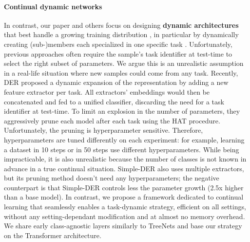 \paragraph{Continual dynamic networks} In contrast, our paper and others focus on designing
\textbf{dynamic architectures} that best handle a growing training distribution
\citep{yoon2018dynamically_expandable_networks,li2019learning_to_grow}, in particular by dynamically
creating (sub-)members each specialized in one specific task
\citep{fernando2017path_net,golkar2019neural_pruning,
    hung2019cpg,rusu2016progressive,routingnetworkcollier,wen2020batchensemble}. Unfortunately, previous
approaches often require the sample's task identifier at test-time to select the right subset of
parameters. We argue this is an unrealistic assumption in a real-life situation where new samples
could come from any task.
Recently, DER \citep{yan2021der} proposed a dynamic expansion of the representation by adding a new
feature extractor per task. All extractors' embeddings would then be concatenated and fed to a
unified classifier, discarding the need for a task identifier at test-time. To limit an explosion in
the number of parameters, they aggressively prune each model after each task using the HAT
\citep{serra2018hat} procedure. Unfortunately, the pruning is hyperparameter sensitive. Therefore,
hyperparameters are tuned differently on each experiment: for example, learning a dataset in 10
steps or in 50 steps use different hyperparameters. While being impracticable, it is also
unrealistic because the number of classes is not known in advance in a true continual situation.
Simple-DER \citep{li2021preserve} also uses multiple extractors, but its pruning method doesn't need
any hyperparameters; the negative counterpart is that Simple-DER controls less the parameter growth
(2.5x higher than a base model). In contrast, we propose a framework dedicated to continual learning
that seamlessly enables a task-dynamic strategy, efficient on all settings, without any
setting-dependant modification and at almost no memory overhead. We share early class-agnostic
\citep{olah2017feature} layers similarly to TreeNets \citep{lee2015treenet} and base our strategy on
the Transformer architecture.

